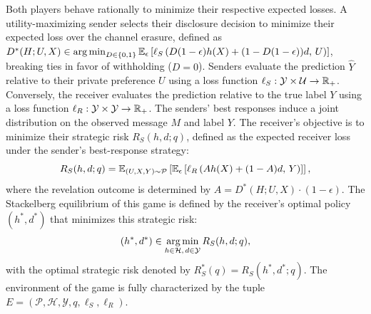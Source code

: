 Both players behave rationally to minimize their respective expected losses. A utility-maximizing sender selects their disclosure decision to minimize their expected loss over the channel erasure, defined as $D^*(H; U, X) \in \operatorname*{arg\,min}_{D \in \{0, 1\}} \mathbb{E}_{\epsilon} \left[ \ell_S\left( D(1-\epsilon)h(X) + (1 - D(1-\epsilon))d, \, U \right) \right]$, breaking ties in favor of withholding ($D = 0$). Senders evaluate the prediction $\hat{Y}$ relative to their private preference $U$ using a loss function $\ell_S: \mathcal{Y} \times \mathcal{U} \to \mathbb{R}_+$. Conversely, the receiver evaluates the prediction relative to the true label $Y$ using a loss function $\ell_R: \mathcal{Y} \times \mathcal{Y} \to \mathbb{R}_+$. The senders' best responses induce a joint distribution on the observed message $M$ and label $Y$. The receiver's objective is to minimize their strategic risk $R_S(h, d; q)$, defined as the expected receiver loss under the sender's best-response strategy:
\begin{equation}
    \label{eq:strategic_risk}
    R_S(h, d; q) = \mathbb{E}_{(U, X, Y) \sim \mathcal{P}} \left[ \mathbb{E}_{\epsilon} \left[ \ell_R\left( A h(X) + (1-A)d, \, Y \right) \right] \right],
\end{equation}
where the revelation outcome is determined by $A = D^*(H; U, X) \cdot (1 - \epsilon)$. The Stackelberg equilibrium of this game is defined by the receiver's optimal policy $(h^*, d^*)$ that minimizes this strategic risk:
\begin{equation}
    \label{eq:stackelberg_opt}
    (h^*, d^*) \in \operatorname*{arg\,min}_{h \in \mathcal{H}, \, d \in \mathcal{Y}} R_S(h, d; q),
\end{equation}
with the optimal strategic risk denoted by $R_S^*(q) = R_S(h^*, d^*; q)$. The environment of the game is fully characterized by the tuple $E = (\mathcal{P}, \mathcal{H}, \mathcal{Y}, q, \ell_S, \ell_R)$.

